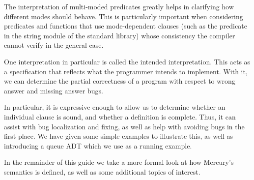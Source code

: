 The interpretation of multi-moded predicates
greatly helps in clarifying how different modes should behave.
This is particularly important when considering
predicates and functions that use mode-dependent clauses
(such as the predicate 
in the string module of the standard library)
whose consistency the compiler cannot verify in the general case.

One interpretation in particular
is called the intended interpretation.
This acts as a specification
that reflects what the programmer intends to implement.
With it, we can determine the partial correctness of a program
with respect to wrong answer and missing answer bugs.

In particular,
it is expressive enough to allow us to determine
whether an individual clause is sound,
and whether a definition is complete.
Thus, it can assist with bug localization and fixing,
as well as help with avoiding bugs in the first place.
We have given some simple examples to illustrate this,
as well as introducing a queue ADT
which we use as a running example.

In the remainder of this guide
we take a more formal look at
how Mercury's semantics is defined,
as well as some additional topics of interest.
